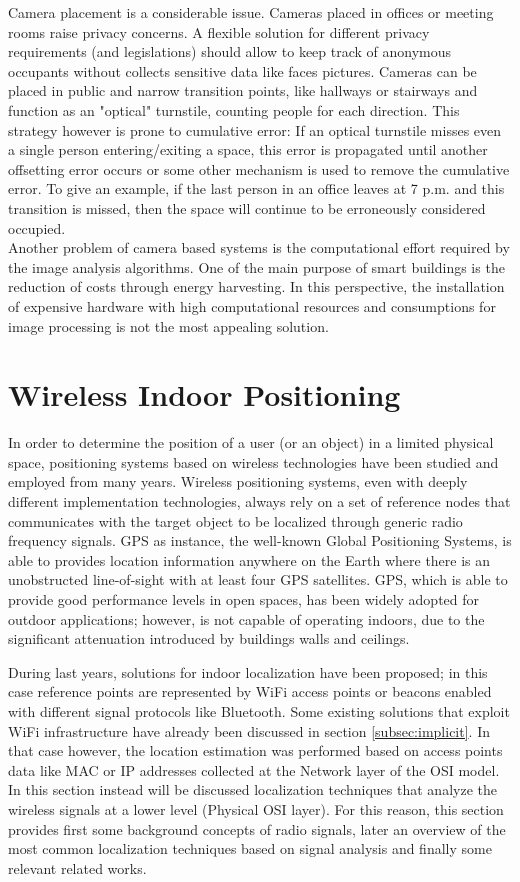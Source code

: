 \medskip
Camera placement is a considerable issue. Cameras placed in offices or meeting rooms raise privacy concerns. A flexible solution for different privacy requirements (and legislations) should allow to keep track of anonymous occupants without collects sensitive data like faces pictures. Cameras can be placed in public and narrow transition points, like hallways or stairways and function as an "optical" turnstile, counting people for each direction. This strategy however is prone to cumulative error: If an optical turnstile misses even a single person entering/exiting a space, this error is propagated until another offsetting error occurs or some other mechanism is used to remove the cumulative error. To give an example, if the last person in an office leaves at 7 p.m. and this transition is missed, then the space will continue to be erroneously considered occupied.\\
Another problem of camera based systems is the computational effort required by the image analysis algorithms. One of the main purpose of smart buildings is the reduction of costs through energy harvesting. In this perspective, the installation of expensive hardware with high computational resources and consumptions for image processing is not the most appealing solution.

\section{Wireless Indoor Positioning}
\label{sec:wips}

In order to determine the position of a user (or an object) in a limited physical space, positioning systems based on wireless technologies have been studied and employed from many years.
Wireless positioning systems, even with deeply different implementation technologies, always rely on a set of reference nodes that communicates with the target object to be localized through generic radio frequency signals.
GPS as instance, the well-known Global Positioning Systems, is able to provides location information anywhere on the Earth where there is an unobstructed line-of-sight with at least four GPS satellites. GPS, which is able to provide good performance levels in open spaces, has been widely adopted for outdoor applications; however, is not capable of operating indoors, due to the significant attenuation introduced by buildings walls and ceilings.

\smallskip
During last years, solutions for indoor localization have been proposed; in this case reference points are represented by WiFi access points or beacons enabled with different signal protocols like Bluetooth.
Some existing solutions that exploit WiFi infrastructure have already been discussed in section \ref{subsec:implicit}. In that case however, the location estimation was performed based on access points data like MAC or IP addresses collected at the Network layer of the OSI model. In this section instead will be discussed localization techniques that analyze the wireless signals at a lower level (Physical OSI layer). For this reason, this section provides first some background concepts of radio signals, later an overview of the most common localization techniques based on signal analysis and finally some relevant related works.

